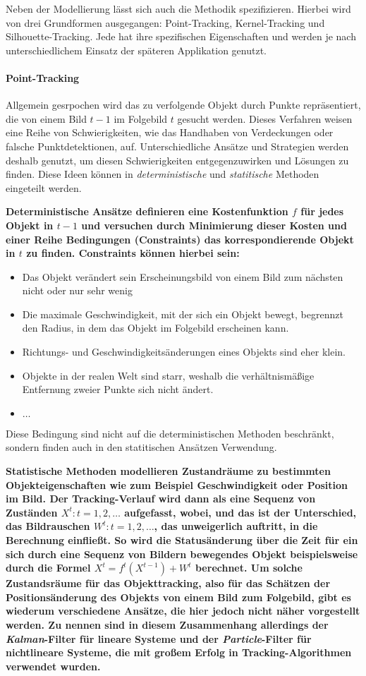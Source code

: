 Neben der Modellierung lässt sich auch die Methodik spezifizieren. Hierbei wird von drei Grundformen ausgegangen: Point-Tracking, Kernel-Tracking und Silhouette-Tracking. Jede hat ihre spezifischen Eigenschaften und werden je nach unterschiedlichem Einsatz der späteren Applikation genutzt.

\paragraph{Point-Tracking}
Allgemein gesrpochen wird das zu verfolgende Objekt durch Punkte repräsentiert, die von einem Bild $t-1$ im Folgebild $t$ gesucht werden. Dieses Verfahren weisen eine Reihe von Schwierigkeiten, wie das Handhaben von Verdeckungen oder falsche Punktdetektionen, auf. Unterschiedliche Ansätze und Strategien werden deshalb genutzt, um diesen Schwierigkeiten entgegenzuwirken und Lösungen zu finden. Diese Ideen können in \textit{deterministische} und \textit{statitische} Methoden eingeteilt werden. 

\bf{Deterministische Ansätze} definieren eine Kostenfunktion $f$ für jedes Objekt in $t-1$ und versuchen durch Minimierung dieser Kosten und einer Reihe Bedingungen (Constraints) das korrespondierende Objekt in $t$ zu finden. Constraints können hierbei sein:

\begin{itemize}
\item Das Objekt verändert sein Erscheinungsbild von einem Bild zum nächsten nicht oder nur sehr wenig \cite{FPIS}
\item Die maximale Geschwindigkeit, mit der sich ein Objekt bewegt, begrennzt den Radius, in dem das Objekt im Folgebild erscheinen kann.
\item Richtungs- und Geschwindigkeitsänderungen eines Objekts sind eher klein.
\item Objekte in der realen Welt sind starr, weshalb die verhältnismäßige Entfernung zweier Punkte sich nicht ändert.
\item $\dots$
\end{itemize}
Diese Bedingung sind nicht auf die deterministischen Methoden beschränkt, sondern finden auch in den statitischen Ansätzen Verwendung. 

\bf{Statistische Methoden} modellieren Zustandräume zu bestimmten Objekteigenschaften wie zum Beispiel Geschwindigkeit oder Position im Bild. Der Tracking-Verlauf wird dann als eine Sequenz von Zuständen $X^{t}:t=1,2,\dots$ aufgefasst, wobei, und das ist der Unterschied, das Bildrauschen $W^{t}:t=1,2,\dots$, das unweigerlich auftritt, in die Berechnung einfließt. So wird die Statusänderung über die Zeit für ein sich durch eine Sequenz von Bildern bewegendes Objekt beispielsweise durch die Formel $X^{t}=f^{t}(X^{t-1})+W^{t}$ berechnet. Um solche Zustandsräume für das Objekttracking, also für das Schätzen der Positionsänderung des Objekts von einem Bild zum Folgebild, gibt es wiederum verschiedene Ansätze, die hier jedoch nicht näher vorgestellt werden. Zu nennen sind in diesem Zusammenhang allerdings der \textit{Kalman}-Filter\cite{KAF} für lineare Systeme und der \textit{Particle}-Filter \cite{PAF} für nichtlineare Systeme, die mit großem Erfolg in Tracking-Algorithmen verwendet wurden.

